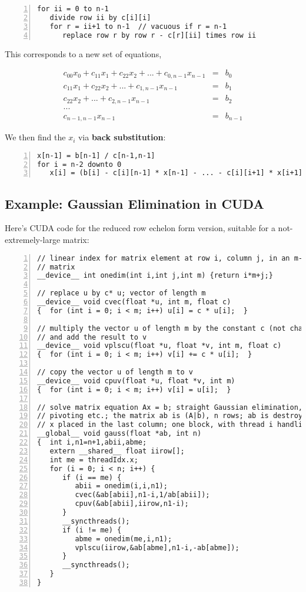\begin{lstlisting}[numbers=left]
for ii = 0 to n-1
   divide row ii by c[i][i]
   for r = ii+1 to n-1  // vacuous if r = n-1
      replace row r by row r - c[r][ii] times row ii
\end{lstlisting}

This corresponds to a new set of equations,

\begin{eqnarray*}
c_{00} x_0 +c_{11} x_1 + c_{22} x_2 + ... + c_{0,n-1} x_{n-1} &=& b_0  \\ 
c_{11} x_1 + c_{22} x_2 + ... + c_{1,n-1} x_{n-1} &=& b_1  \\ 
c_{22} x_2 + ... + c_{2,n-1} x_{n-1} &=& b_2  \\ 
... & & \\
c_{n-1,n-1} x_{n-1} &=& b_{n-1} 
\end{eqnarray*}

We then find the $x_i$ via {\bf back substitution}:

\begin{lstlisting}[numbers=left]
x[n-1] = b[n-1] / c[n-1,n-1]
for i = n-2 downto 0
   x[i] = (b[i] - c[i][n-1] * x[n-1] - ... - c[i][i+1] * x[i+1]) / c[i][i]
\end{lstlisting}

\subsection{Example:  Gaussian Elimination in CUDA}

Here's CUDA code for the reduced row echelon form version, suitable for
a not-extremely-large matrix:

\begin{lstlisting}[numbers=left]
// linear index for matrix element at row i, column j, in an m-column
// matrix
__device__ int onedim(int i,int j,int m) {return i*m+j;}

// replace u by c* u; vector of length m
__device__ void cvec(float *u, int m, float c)
{  for (int i = 0; i < m; i++) u[i] = c * u[i];  }

// multiply the vector u of length m by the constant c (not changing u)
// and add the result to v
__device__ void vplscu(float *u, float *v, int m, float c)
{  for (int i = 0; i < m; i++) v[i] += c * u[i];  }

// copy the vector u of length m to v
__device__ void cpuv(float *u, float *v, int m)
{  for (int i = 0; i < m; i++) v[i] = u[i];  }

// solve matrix equation Ax = b; straight Gaussian elimination, no
// pivoting etc.; the matrix ab is (A|b), n rows; ab is destroyed, with
// x placed in the last column; one block, with thread i handling row i
__global__ void gauss(float *ab, int n)
{  int i,n1=n+1,abii,abme;
   extern __shared__ float iirow[];
   int me = threadIdx.x;
   for (i = 0; i < n; i++) {  
      if (i == me) {
         abii = onedim(i,i,n1);
         cvec(&ab[abii],n1-i,1/ab[abii]);
         cpuv(&ab[abii],iirow,n1-i);
      }
      __syncthreads();
      if (i != me) {
         abme = onedim(me,i,n1);
         vplscu(iirow,&ab[abme],n1-i,-ab[abme]);
      }
      __syncthreads();
   }
}
\end{lstlisting}

